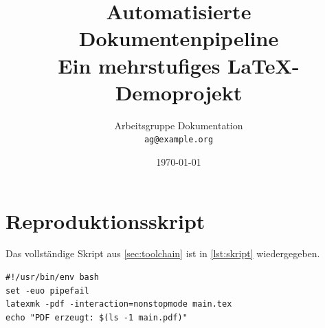 \documentclass[11pt,a4paper,ngerman]{article}
\title{Automatisierte Dokumentenpipeline\\[0.4em]\large Ein mehrstufiges \LaTeX-Demoprojekt}
\author{Arbeitsgruppe Dokumentation \\ \texttt{ag@example.org}}
\date{\today}
\begin{document}
\maketitle
\tableofcontents
\listoffigures
\listoftables
\newpage






\appendix
\section{Reproduktionsskript}
\label{app:skript}
Das vollständige Skript aus \cref{sec:toolchain} ist in
\cref{lst:skript} wiedergegeben.

\begin{lstlisting}[caption={Build-Skript des Demoprojekts}, label={lst:skript}]
#!/usr/bin/env bash
set -euo pipefail
latexmk -pdf -interaction=nonstopmode main.tex
echo "PDF erzeugt: $(ls -1 main.pdf)"
\end{lstlisting}

\clearpage


\end{document}
